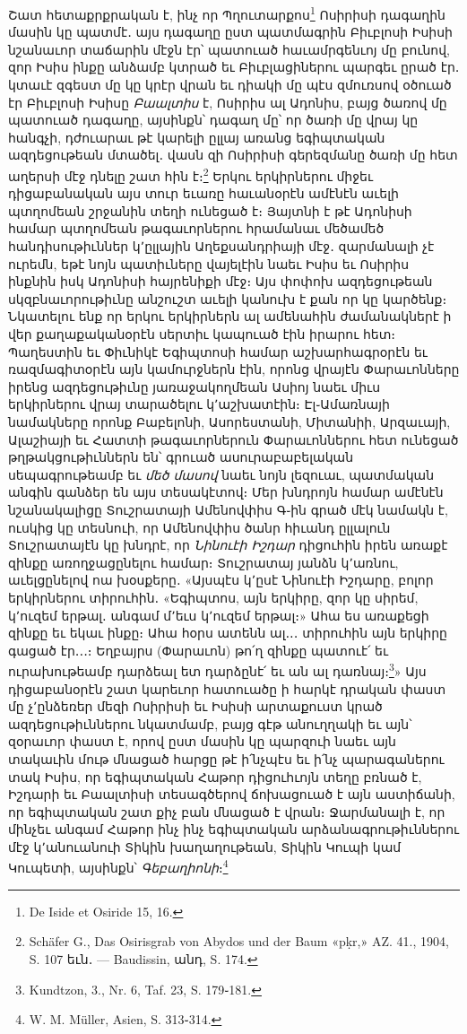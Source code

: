 \documentclass{article}
\begin{document}
{Շատ հետաքրքրական է, ինչ որ Պղուտարքոս\footnote{De Iside et Osiride 15, 16.} Ոսիրիսի դագաղին մասին կը պատմէ․ այս դագաղը ըստ պատմագրին Բիւբլոսի Իսիսի նշանաւոր տաճարին մէջն էր՝ պատուած հաւամրգենւոյ մը բունով, զոր Իսիս ինքը անձամբ կտրած եւ Բիւբլացիներու պարգեւ ըրած էր․ կտաւէ զգեստ մը կը կրէր վրան եւ դիակի մը պէս զմուռսով օծուած էր Բիւբլոսի Իսիսը \emph{Բաալտիս} է, Ոսիրիս ալ Ադոնիս, բայց ծառով մը պատուած դագաղը, այսինքն՝ դագաղ մը՝ որ ծառի մը վրայ կը հանգչի, դժուարաւ թէ կարելի ըլլայ առանց եգիպտական ազդեցութեան մտածել․ վասն զի Ոսիրիսի գերեզմանը ծառի մը հետ աղերսի մէջ դնելը շատ հին է։\footnote{Schäfer G., Das Osirisgrab von Abydos und der Baum «pḳr,» AZ. 41., 1904, S. 107 եւն․ — Baudissin, անդ, S. 174.} Երկու երկիրներու միջեւ դիցաբանական այս տուր եւառը հաւանօրէն ամէնէն աւելի պտղոմեան շրջանին տեղի ունեցած է։ Յայտնի է թէ Ադոնիսի համար պտղոմեան թագաւորներու հրամանաւ մեծամեծ հանդիսութիւններ կ՚ըլլային Աղեքսանդրիայի մէջ․ զարմանալի չէ ուրեմն, եթէ նոյն պատիւները վայելէին նաեւ Իսիս եւ Ոսիրիս ինքնին իսկ Ադոնիսի հայրենիքի մէջ։ Այս փոփոխ ազդեցութեան սկզբնաւորութիւնը անշուշտ աւելի կանուխ է քան որ կը կարծենք։ Նկատելու ենք որ երկու երկիրներն ալ ամենահին ժամանակներէ ի վեր քաղաքականօրէն սերտիւ կապուած էին իրարու հետ։ Պաղեստին եւ Փիւնիկէ Եգիպտոսի համար աշխարհագրօրէն եւ ռազմագիտօրէն այն կամուրջներն էին, որոնց վրայէն Փարաւոնները իրենց ազդեցութիւնը յառաջակողմեան Ասիոյ նաեւ միւս երկիրներու վրայ տարածելու կ՚աշխատէին։ Էլ֊Ամառնայի նամակները որոնք Բաբելոնի, Ասորեստանի, Միտանիի, Արզաւայի, Ալաշիայի եւ Հատտի թագաւորներուն Փարաւոններու հետ ունեցած թղթակցութիւններն են՝ գրուած ասուրաբաբելական սեպագրութեամբ եւ \emph{մեծ մասով} նաեւ նոյն լեզուաւ, պատմական անգին գանձեր են այս տեսակէտով։ Մեր խնդրոյն համար ամէնէն նշանակալիցը Տուշրատայի Ամենովփիս Գ֊ին գրած մէկ նամակն է, ուսկից կը տեսնուի, որ Ամենովփիս ծանր հիւանդ ըլլալուն Տուշրատայէն կը խնդրէ, որ \emph{Նինուէի Իշդար} դիցուհին իրեն առաքէ զինքը առողջացընելու համար։ Տուշրատայ յանձն կ՚առնու, աւելցընելով ոա խօսքերը․ «Այսպէս կ՚ըսէ Նինուէի Իշդարը, բոլոր երկիրներու տիրուհին․ «Եգիպտոս, այն երկիրը, զոր կը սիրեմ, կ՚ուզեմ երթալ․ անգամ մ՚եւս կ՚ուզեմ երթալ։» Ահա ես առաքեցի զինքը եւ եկաւ ինքը։ Ահա հօրս ատենն ալ․․․ տիրուհին այն երկիրը գացած էր․․․։ Եղբայրս (Փարաւոն) թո՛ղ զինքը պատուէ՛ եւ ուրախութեամբ դարձեալ ետ դարձընէ՛ եւ ան ալ դառնայ։\footnote{Kundtzon, 3., Nr. 6, Taf. 23, S. 179֊181.}» Այս դիցաբանօրէն շատ կարեւոր հատուածը ի հարկէ դրական փաստ մը չ՚ընձեռեր մեզի Ոսիրիսի եւ Իսիսի արտաքուստ կրած ազդեցութիւններու նկատմամբ, բայց գէթ անուղղակի եւ այն՝ զօրաւոր փաստ է, որով ըստ մասին կը պարզուի նաեւ այն տակաւին մութ մնացած հարցը թէ ի՛նչպէս եւ ի՛նչ պարագաներու տակ Իսիս, որ եգիպտական Հաթոր դիցուհւոյն տեղը բռնած է, Իշդարի եւ Բաալտիսի տեսագծերով ճոխացուած է այն աստիճանի, որ եգիպտական շատ քիչ բան մնացած է վրան։ Ջարմանալի է, որ մինչեւ անգամ Հաթոր ինչ ինչ եգիպտական արձանագրութիւններու մէջ կ՚անուանուի Տիկին խաղաղութեան, Տիկին Կուպի կամ Կուպետի, այսինքն՝ \emph{Գեբաղիոնի}։\footnote{W. M. Müller, Asien, S. 313֊314.}

}
\end{document}
